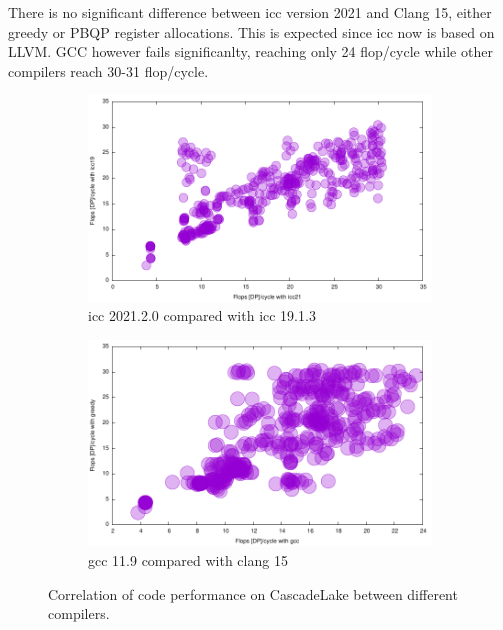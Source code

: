 \documentclass[sigconf,review]{acmart}
\begin{document}
There is no significant difference between icc version 2021 and Clang 15, either greedy or PBQP register allocations. This is expected since icc now is based on LLVM. GCC however fails significanlty, reaching  only 24 flop/cycle while other compilers reach 30-31 flop/cycle. 
\begin{figure}[ht]
  \begin{subfigure}[h]{0.45\textwidth}
  \includegraphics[width=\textwidth]{../benches/gemm/cascadelake-64x256x64/icc21xicc19.pdf}
  \caption{icc 2021.2.0 compared with icc 19.1.3}
  \end{subfigure}
  \begin{subfigure}[h]{0.45\textwidth}  
\includegraphics[width=\textwidth]{../benches/gemm/cascadelake-64x256x64/gccxgreedy.pdf}
  \caption{gcc 11.9 compared with clang 15}
  \end{subfigure}
  \caption{Correlation of code performance on CascadeLake between different compilers.\label{fig:cascadelakecorrelation}}
\end{figure}
\end{document}
